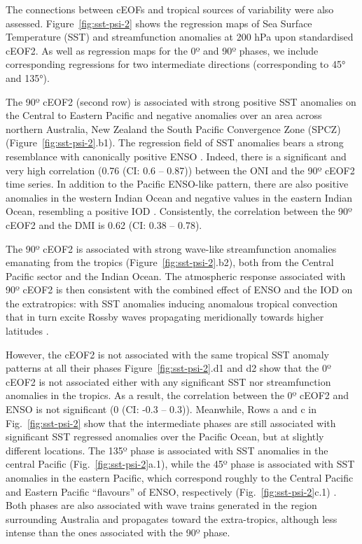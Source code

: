 \documentclass[pdflatex,lineno,sn-basic]{sn-jnl}
\theoremstyle{thmstyleone}%
\theoremstyle{thmstyletwo}%
\theoremstyle{thmstylethree}%
\begin{document}
The connections between cEOFs and tropical sources of variability were also assessed.
Figure~\ref{fig:sst-psi-2} shows the regression maps of Sea Surface Temperature (SST) and streamfunction anomalies at 200 hPa upon standardised cEOF2.
As well as regression maps for the 0º and 90º phases, we include corresponding regressions for two intermediate directions (corresponding to 45° and 135°).

The 90º cEOF2 (second row) is associated with strong positive SST anomalies on the Central to Eastern Pacific and negative anomalies over an area across northern Australia, New Zealand the South Pacific Convergence Zone (SPCZ) (Figure~\ref{fig:sst-psi-2}.b1).
The regression field of SST anomalies bears a strong resemblance with canonically positive ENSO \citep{bamston1997}.
Indeed, there is a significant and very high correlation (0.76 (CI: 0.6 -- 0.87)) between the ONI and the 90º cEOF2 time series.
In addition to the Pacific ENSO-like pattern, there are also positive anomalies in the western Indian Ocean and negative values in the eastern Indian Ocean, resembling a positive IOD \citep{saji1999}.
Consistently, the correlation between the 90º cEOF2 and the DMI is 0.62 (CI: 0.38 -- 0.78).

The 90º cEOF2 is associated with strong wave-like streamfunction anomalies emanating from the tropics (Figure~\ref{fig:sst-psi-2}.b2), both from the Central Pacific sector and the Indian Ocean.
The atmospheric response associated with 90º cEOF2 is then consistent with the combined effect of ENSO and the IOD on the extratropics: with SST anomalies inducing anomalous tropical convection that in turn excite Rossby waves propagating meridionally towards higher latitudes \citep{mo2000, cai2011, nuncio2015}.

However, the cEOF2 is not associated with the same tropical SST anomaly patterns at all their phases
Figure~\ref{fig:sst-psi-2}.d1 and d2 show that the 0º cEOF2 is not associated either with any significant SST nor streamfunction anomalies in the tropics.
As a result, the correlation between the 0º cEOF2 and ENSO is not significant (0 (CI: -0.3 -- 0.3)).
Meanwhile, Rows a and c in Fig.~\ref{fig:sst-psi-2} show that the intermediate phases are still associated with significant SST regressed anomalies over the Pacific Ocean, but at slightly different locations.
The 135º phase is associated with SST anomalies in the central Pacific (Fig.~\ref{fig:sst-psi-2}a.1), while the 45º phase is associated with SST anomalies in the eastern Pacific, which correspond roughly to the Central Pacific and Eastern Pacific ``flavours'' of ENSO, respectively (Fig.~\ref{fig:sst-psi-2}c.1) \citep{kao2009}.
Both phases are also associated with wave trains generated in the region surrounding Australia and propagates toward the extra-tropics, although less intense than the ones associated with the 90º phase.
\end{document}
